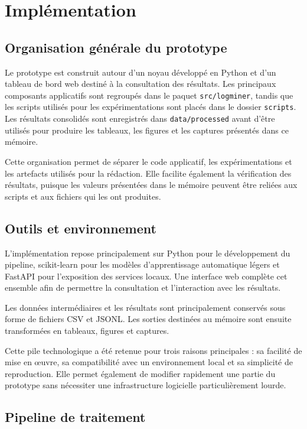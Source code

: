 \chapter{Implémentation}

\section{Organisation générale du prototype}

Le prototype \logminer{} est construit autour d'un noyau développé en Python et d'un tableau de bord web destiné à la consultation des résultats. Les principaux composants applicatifs sont regroupés dans le paquet \texttt{src/logminer}, tandis que les scripts utilisés pour les expérimentations sont placés dans le dossier \texttt{scripts}. Les résultats consolidés sont enregistrés dans \texttt{data/processed} avant d'être utilisés pour produire les tableaux, les figures et les captures présentés dans ce mémoire.

Cette organisation permet de séparer le code applicatif, les expérimentations et les artefacts utilisés pour la rédaction. Elle facilite également la vérification des résultats, puisque les valeurs présentées dans le mémoire peuvent être reliées aux scripts et aux fichiers qui les ont produites.

\section{Outils et environnement}

L'implémentation repose principalement sur Python pour le développement du pipeline, scikit-learn pour les modèles d'apprentissage automatique légers et FastAPI pour l'exposition des services locaux. Une interface web complète cet ensemble afin de permettre la consultation et l'interaction avec les résultats.

Les données intermédiaires et les résultats sont principalement conservés sous forme de fichiers CSV et JSONL. Les sorties destinées au mémoire sont ensuite transformées en tableaux, figures et captures.

Cette pile technologique a été retenue pour trois raisons principales : sa facilité de mise en œuvre, sa compatibilité avec un environnement local et sa simplicité de reproduction. Elle permet également de modifier rapidement une partie du prototype sans nécessiter une infrastructure logicielle particulièrement lourde.

\section{Pipeline de traitement}

